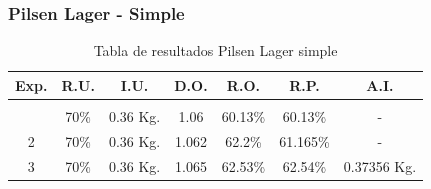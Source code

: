         \subsubsection{Pilsen Lager - Simple}
        
        \begin{longtable}{|p{1cm}|p{1.7cm}|p{2cm}|p{2cm}|p{2cm}| p{1cm}| p{1cm}|}
        \hline
        Exp. %
        & \multicolumn{1}{c|}{R.U.} %
        & \multicolumn{1}{c|}{I.U.} %
        & \multicolumn{1}{c|}{D.O.} %
        & \multicolumn{1}{c|}{R.O.} %
        & \multicolumn{1}{c|}{R.P.} %
        & \multicolumn{1}{c|}{A.I.} %
        \\
        \endfirsthead
        
        \endhead
 
        \endfoot
        
        \hline
        \caption{Tabla de resultados Pilsen Lager simple\label{tab:ResultadosPilsenSimple}}\\
        \endlastfoot
        \hline
             \multicolumn{1}{|c|}{1} 
             & \multicolumn{1}{c|}{70\%} %
             & \multicolumn{1}{c|}{0.36 Kg.} %
             & \multicolumn{1}{c|}{1.06 } %
             & \multicolumn{1}{c|}{60.13\%} %
             & \multicolumn{1}{c|}{60.13\%} %
             & \multicolumn{1}{c|}{-} %
             \\
             \hline
             
             \multicolumn{1}{|c|}{2} 
             & \multicolumn{1}{c|}{70\%} %
             & \multicolumn{1}{c|}{0.36 Kg.} %
             & \multicolumn{1}{c|}{1.062} %
             & \multicolumn{1}{c|}{62.2\%} %
             &\multicolumn{1}{c|}{61.165\%} %
             &\multicolumn{1}{c|}{-} %
             
             \\
             \hline
             
             \multicolumn{1}{|c|}{3} 
             & \multicolumn{1}{c|}{70\%} %
             & \multicolumn{1}{c|}{0.36 Kg.} %
             & \multicolumn{1}{c|}{1.065} %
             & \multicolumn{1}{c|}{62.53\%} %
             &\multicolumn{1}{c|}{62.54\%} %
             &\multicolumn{1}{c|}{0.37356 Kg.} %
             

\end{longtable}
